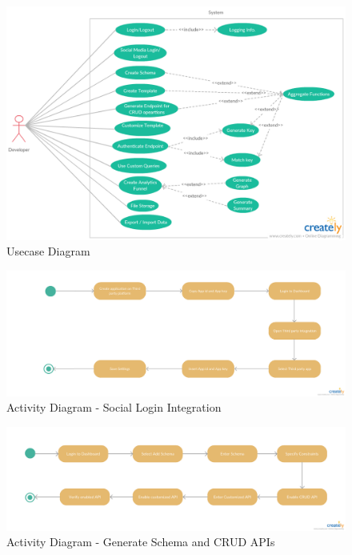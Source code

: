 \documentclass[a4paper,12pt]{report}
\begin{document}
        \begin{figure}[h] \centering
          \includegraphics[width=8.5in, angle=90]{images/usecase.png}
        \caption{ Usecase Diagram}  
        \end{figure}

        \begin{figure}[h] \centering
          \includegraphics[width=8.5in , angle=90]{images/PPI-2.png}
          \caption{ Activity Diagram - Social Login Integration}  
        \end{figure}

        \begin{figure}[h] \centering
          \includegraphics[width=8.5in , angle=90]{images/PPI-3.png}
          \caption{ Activity Diagram - Generate Schema and CRUD APIs}  
        \end{figure}
\end{document}
